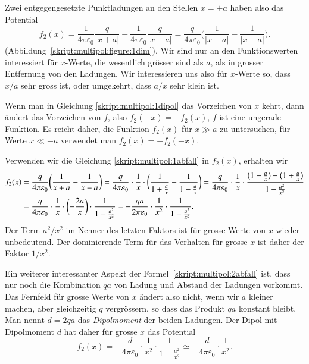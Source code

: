 Zwei entgegengesetzte Punktladungen an den Stellen $x=\pm a$ haben also
das Potential
\begin{equation}
f_2(x)
=
\frac1{4\pi\varepsilon_0}\frac{q}{|x+a|}
-
\frac1{4\pi\varepsilon_0}\frac{q}{|x-a|}
=
\frac{q}{4\pi\varepsilon_0}\biggl( \frac1{|x+a|} - \frac1{|x-a|} \biggr).
\label{skript:multipol:1dipol}
\end{equation}
(Abbildung~\ref{skript:multipol:figure:1dim}).
Wir sind nur an den Funktionswerten interessiert für $x$-Werte, die
wesentlich grösser sind als $a$, als in grosser Entfernung von
den Ladungen.
Wir interessieren uns also für $x$-Werte so, dass $x/a$ sehr gross ist,
oder umgekehrt, dass $a/x$ sehr klein ist.

Wenn man in Gleichung \eqref{skript:multipol:1dipol} das Vorzeichen
von $x$ kehrt, dann ändert das Vorzeichen von $f$, also $f_2(-x)=-f_2(x)$,
$f$ ist eine ungerade Funktion.
Es reicht daher, die Funktion $f_2(x)$ für $x\gg a$ zu untersuchen,
für Werte $x\ll -a$ verwendet man $f_2(x)=-f_2(-x)$.

Verwenden wir die Gleichung \eqref{skript:multipol:1abfall} in $f_2(x)$,
erhalten wir
\begin{align}
f_2(x)
&=
\frac{q}{4\pi\varepsilon_0}\biggl(\frac1{x+a}-\frac1{x-a}\biggr)
=
\frac{q}{4\pi\varepsilon_0}\cdot\frac1x\cdot\biggl(
\frac1{1+\frac{a\mathstrut}{x}}
-
\frac1{1-\frac{a\mathstrut}{x}}
\biggr)
=
\frac{q}{4\pi\varepsilon_0}\cdot\frac1x\cdot
\frac{\bigl(1-\frac{a}{x}\bigr)-\bigl(1+\frac{a}{x}\bigr)}{1-\frac{a^2}{x^2}}
\notag
\\
&=
\frac{q}{4\pi\varepsilon_0}\cdot\frac1x\cdot
\biggl(-\frac{2a}{x}\biggr)
\cdot
\frac1{1-\frac{a^2}{x^2}}
=
-\frac{qa}{2\pi\varepsilon_0}\cdot\frac1{x^2}\cdot\frac{1}{1-\frac{a^2}{x^2}}.
\label{skript:multipol:2abfall}
\end{align}
Der Term $a^2/x^2$ im Nenner des letzten Faktors ist für grosse Werte von
$x$ wieder unbedeutend.
Der dominierende Term für das Verhalten für grosse $x$ ist daher der
Faktor $1/x^2$.

Ein weiterer interessanter Aspekt der Formel~\eqref{skript:multipol:2abfall}
ist, dass nur noch die Kombination $qa$ von Ladung und Abstand der Ladungen
vorkommt.
Das Fernfeld für grosse Werte von $x$ ändert also nicht, wenn wir $a$
kleiner machen, aber gleichzeitig $q$ vergrössern, so dass das Produkt
$qa$ konstant bleibt.
Man nennt $d=2qa$ das {\em Dipolmoment} der beiden Ladungen.
%
Der Dipol mit Dipolmoment $d$ hat daher für grosse $x$ das Potential
\[
f_2(x)
=
-\frac{d}{4\pi\varepsilon_0}\cdot \frac1{x^2}\cdot \frac1{1-\frac{a^2}{x^2}}
\simeq
-\frac{d}{4\pi\varepsilon_0}\cdot \frac1{x^2}.
\]


